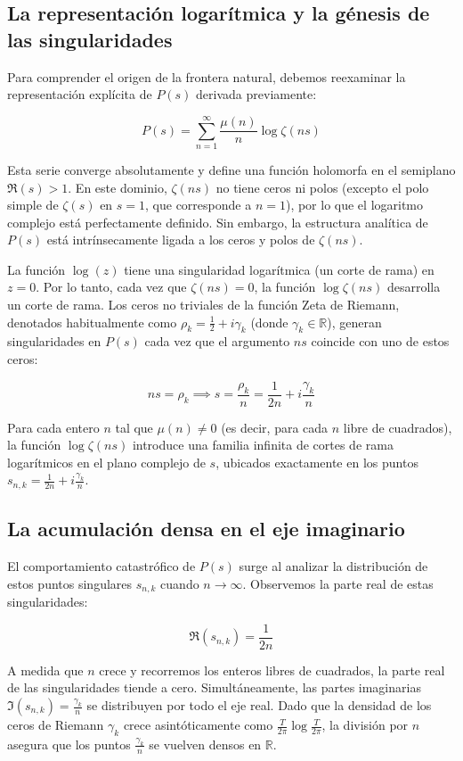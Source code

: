 \subsection{La representación logarítmica y la génesis de las singularidades}

Para comprender el origen de la frontera natural, debemos reexaminar la representación explícita de $P(s)$ derivada previamente:

$$ P(s) = \sum_{n=1}^{\infty} \frac{\mu(n)}{n} \log \zeta(ns) $$

Esta serie converge absolutamente y define una función holomorfa en el semiplano $\Re(s) > 1$. En este dominio, $\zeta(ns)$ no tiene ceros ni polos (excepto el polo simple de $\zeta(s)$ en $s=1$, que corresponde a $n=1$), por lo que el logaritmo complejo está perfectamente definido. Sin embargo, la estructura analítica de $P(s)$ está intrínsecamente ligada a los ceros y polos de $\zeta(ns)$. 

La función $\log(z)$ tiene una singularidad logarítmica (un corte de rama) en $z=0$. Por lo tanto, cada vez que $\zeta(ns) = 0$, la función $\log \zeta(ns)$ desarrolla un corte de rama. Los ceros no triviales de la función Zeta de Riemann, denotados habitualmente como $\rho_k = \frac{1}{2} + i\gamma_k$ (donde $\gamma_k \in \mathbb{R}$), generan singularidades en $P(s)$ cada vez que el argumento $ns$ coincide con uno de estos ceros:

$$ ns = \rho_k \implies s = \frac{\rho_k}{n} = \frac{1}{2n} + i\frac{\gamma_k}{n} $$

Para cada entero $n$ tal que $\mu(n) \neq 0$ (es decir, para cada $n$ libre de cuadrados), la función $\log \zeta(ns)$ introduce una familia infinita de cortes de rama logarítmicos en el plano complejo de $s$, ubicados exactamente en los puntos $s_{n,k} = \frac{1}{2n} + i\frac{\gamma_k}{n}$.

\subsection{La acumulación densa en el eje imaginario}

El comportamiento catastrófico de $P(s)$ surge al analizar la distribución de estos puntos singulares $s_{n,k}$ cuando $n \to \infty$. Observemos la parte real de estas singularidades:

$$ \Re(s_{n,k}) = \frac{1}{2n} $$

A medida que $n$ crece y recorremos los enteros libres de cuadrados, la parte real de las singularidades tiende a cero. Simultáneamente, las partes imaginarias $\Im(s_{n,k}) = \frac{\gamma_k}{n}$ se distribuyen por todo el eje real. Dado que la densidad de los ceros de Riemann $\gamma_k$ crece asintóticamente como $\frac{T}{2\pi} \log \frac{T}{2\pi}$, la división por $n$ asegura que los puntos $\frac{\gamma_k}{n}$ se vuelven densos en $\mathbb{R}$.

